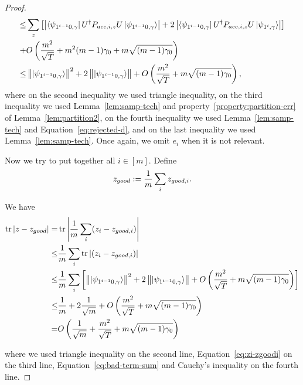 \begin{proof}
\begin{align}
    \leq&  \sum_z   \L[\L| \bra{\psi_{1^{i-1}0,\gamma}}U^\dag  P_{acc,i,z}U    \ket{\psi_{1^{i-1}0,\gamma}} \R|+
    2  \L|\bra{\psi_{1^{i-1}0,\gamma}}U^\dag  P_{acc,i,z}U \ket{\psi_{1^i,\gamma}} \R|  \R]    \nn \\ 
    +&O\L(\frac{m^2}{\sqrt T}+m^2{(m-1)\gamma_0}+m\sqrt{(m-1)\gamma_0}\R)\nn \\ %
    \leq& \norm{\ket{\psi_{1^{i-1}0,\gamma}}}^2+ 2\norm{\ket{\psi_{1^{i-1}0,\gamma}}}+O\L(\frac{m^2}{\sqrt T}+m\sqrt{(m-1)\gamma_0}\R),
\end{align}
where on the second inequality we used triangle inequality, on the third inequality we used  Lemma~\ref{lem:samp-tech} and property~\ref{property:partition-err} of Lemma~\ref{lem:partition2}, on the fourth inequality we used Lemma~\ref{lem:samp-tech} and Equation~\ref{eq:rejected-d}, and on the last inequality we used Lemma~\ref{lem:samp-tech}. Once again, we omit $e_i$ when it is not relevant.







Now we try to  put together all $i\in [m]$. Define
$$z_{good}:= \frac{1}{m}\sum_i z_{good,i}.$$

We have
\begin{align} \label{eq:z-z-good}
    \tr|z-z_{good}| =& \tr\L|\frac{1}{m}\sum_i (z_i-z_{good,i})\R| \nn \\
    \leq&  \frac{1}{m}\sum_i\tr| (z_i-z_{good,i})| \nn \\
    \leq&  \frac{1}{m}\sum_i\L[\norm{\ket{\psi_{1^{i-1}0,\gamma}}}^2+ 2\norm{\ket{\psi_{1^{i-1}0,\gamma}}}+O\L(\frac{m^2}{\sqrt T}+m\sqrt{(m-1)\gamma_0}\R)\R] \nn \\%
    \leq&  \frac{1}{m}+ 2\frac{1}{\sqrt m}+O\L(\frac{m^2}{\sqrt T}+m\sqrt{(m-1)\gamma_0}\R) \nn \\ %
    =&O\L( \frac{1}{\sqrt m}+\frac{m^2}{\sqrt T}+m\sqrt{(m-1)\gamma_0}\R)
\end{align}

where we used triangle inequality on the second line, Equation~\ref{eq:zi-zgoodi} on the third line, Equation~\ref{eq:bad-term-sum} and Cauchy's inequality on the fourth line.






\end{proof}
